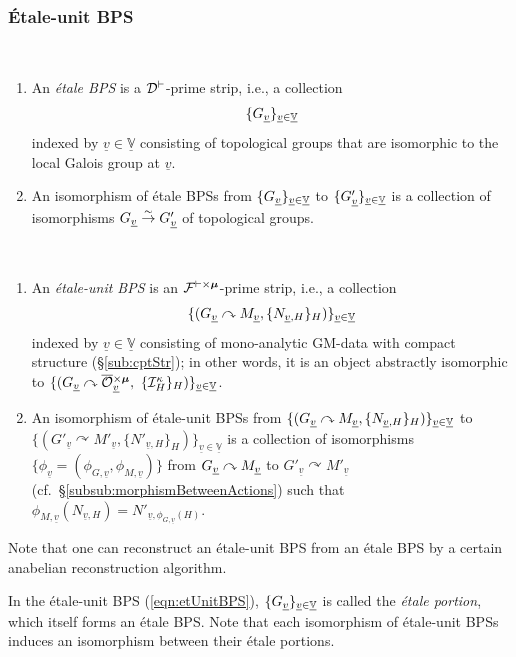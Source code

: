 \documentclass[12pt, reqno, a4paper]{amsart}
\def\udl#1{\underline{#1}} %
\def\simto{\stackrel{\sim}{\rightarrow}} %
\def\acton{\curvearrowright} %
\def\bV{\mathbb{V}}
\def\cI{{\mathcal{I}}}
\def\uV{\udl{\bV}} %
\def\uv{\udl{v}} %
\begin{document}
\subsubsection{\'Etale-unit BPS}\label{subsub:etUnitBPS}
\begin{dfn}\label{dfn:etBPS}\ 

\begin{enumerate}
    \item An \emph{\'etale BPS} is a $\cDv$-prime strip, i.e., a collection
    $$
    \{\GG_{\uv}\}_{\uv\in\uV}
    $$
    indexed by $\uv\in\uV$ consisting of topological groups that are isomorphic to the local Galois group at $\uv$.
    \item An isomorphism of \'etale BPSs from $\{\GG_{\uv}\}_{\uv\in\uV}$ to $\{\GG'_{\uv}\}_{\uv\in\uV}$ is a collection of isomorphisms $\GG_{\uv}\simto \GG'_{\uv}$ of topological groups. 
\end{enumerate}
\end{dfn}

\begin{dfn}\label{dfn:etUnitBPS}\ 

\begin{enumerate}
    \item An \emph{\'etale-unit BPS} is an $\cFvxmu$-prime strip, i.e., a collection
    \begin{equation}\label{eqn:etUnitBPS}
        \{(\GG_{\uv}\acton M_{\uv},\{N_{\uv,H}\}_H)\}_{\uv\in\uV}
    \end{equation}
    indexed by $\uv\in\uV$ consisting of mono-analytic GM-data with compact structure (\S\ref{sub:cptStr}); in other words, it is an object abstractly isomorphic to $\{(\GG_{\uv}\acton\oOOxmu_{\uv},\ \{\cI^{\kappa}_H\}_H)\}_{\uv\in\uV}$.
    \item An isomorphism of \'etale-unit BPSs from $\{(\GG_{\uv}\acton M_{\uv},\{N_{\uv,H}\}_H)\}_{\uv\in\uV}$ to $\{(G'_{\uv}\acton M'_{\uv},\{N'_{\uv,H}\}_H)\}_{\uv\in\uV}$ is a collection of isomorphisms $\{\phi_{\uv}=(\phi_{G,\uv},\phi_{M,\uv})\}$ from $\GG_{\uv}\acton M_{\uv}$ to $G'_{\uv}\acton M'_{\uv}$ (cf.\ \S\ref{subsub:morphismBetweenActions}) such that $\phi_{M,\uv}(N_{\uv,H})=N'_{\uv,\phi_{G,\uv}(H)}$.
\end{enumerate}

Note that one can reconstruct an \'etale-unit BPS from an \'etale BPS by a certain anabelian reconstruction algorithm.  
\end{dfn}

In the \'etale-unit BPS (\ref{eqn:etUnitBPS}), $\{\GG_{\uv}\}_{\uv\in\uV}$ is called the {\it \'etale portion}, which itself forms an \'etale BPS.  
Note that each isomorphism of \'etale-unit BPSs induces an isomorphism between their \'etale portions. 
\end{document}
